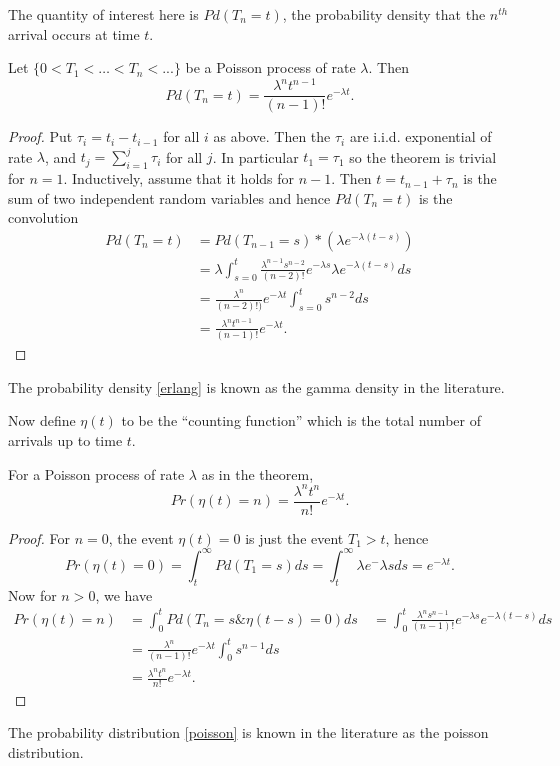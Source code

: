 \documentclass[12pt,leqno]{article}
\begin{document}
The quantity of interest here is $Pd(T_n = t)$, the probability density that the $n^{th}$ arrival occurs at time $t$.
\begin{Thm}
  Let $\{0 < T_1<\dots<T_n<... \}$ be a Poisson process of rate $\lambda$.  Then
  \begin{equation}\label{erlang}
  Pd(T_n = t) = \frac{\lambda^nt^{n-1}}{(n-1)!}e^{-\lambda{t}}.
  \end{equation}
  \begin{proof}
    Put $\tau_i = t_i - t_{i-1}$ for all $i$ as above. Then the $\tau_i$ are i.i.d. exponential of rate $\lambda$, and
    $t_j = \sum_{i=1}^j \tau_i$ for all $j$.  In particular $t_1 = \tau_1$ so the theorem is trivial for $n = 1$.
    Inductively, assume that it holds for $n-1$. Then $t = t_{n-1} + \tau_n$ is the sum of two independent random
    variables and hence $Pd(T_n = t)$ is the convolution
    \begin{align*}
      Pd(T_n = t) &= Pd(T_{n-1} = s)*({\lambda}e^{-\lambda(t-s)})\\
      &= \lambda\int_{s=0}^t\frac{\lambda^{n-1}s^{n-2}}{(n-2)!}e^{-\lambda{s}}{\lambda}e^{-\lambda(t-s)}ds \\
      &= \frac{\lambda^n}{(n-2)!)}e^{-\lambda{t}}\int_{s=0}^ts^{n-2}ds \\
      &= \frac{\lambda^nt^{n-1}}{(n-1)!}e^{-\lambda{t}}.
    \end{align*}
  \end{proof}
\end{Thm}
The probability density \eqref{erlang} is known as the gamma density in the literature.

Now define $\eta(t)$ to be the ``counting function'' which is the total number of arrivals up to time $t$.
\begin{Cor}
  For a Poisson process of rate $\lambda$ as in the theorem, 
  \begin{equation}\label{poisson}
  Pr(\eta(t) = n) = \frac{\lambda^nt^{n}}{n!}e^{-\lambda{t}}.
  \end{equation}
  \begin{proof}
    For $n = 0$, the event $\eta(t) = 0$ is just the event $T_1 > t$, hence
    $$
    Pr(\eta(t) = 0) = \int_t^{\infty}Pd(T_1 = s)ds = \int_t^{\infty}{\lambda}e^-{\lambda{s}}ds = e^{-\lambda{t}}.
    $$
    Now for $n > 0$, we have
    \begin{align*}
      Pr(\eta(t) = n) &= \int_0^tPd(T_n = s \& \eta(t-s) = 0)ds\
      &= \int_0^t\frac{\lambda^ns^{n-1}}{(n-1)!}e^{-\lambda{s}}e^{-\lambda(t-s)}ds\\
      &=\frac{\lambda^n}{(n-1)!}e^{-\lambda{t}}\int_0^t s^{n-1}ds\\
      &= \frac{\lambda^nt^{n}}{n!}e^{-\lambda{t}}.
    \end{align*}
  \end{proof}
\end{Cor}
The probability distribution \eqref{poisson} is known in the literature as the poisson distribution.
\end{document}
